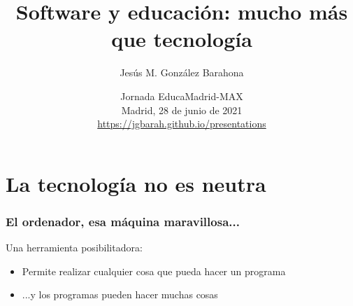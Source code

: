 \documentclass[17pt,aspectratio=169]{beamer}
\renewcommand{\secimage}{figs/bookpages}
\newcommand{\secimage}{figs/bookpages}
\begin{document}
\title{Software y educación: mucho más que tecnología}
\author{Jesús M. González Barahona}

\date{Jornada EducaMadrid-MAX \\
  Madrid, 28 de junio de 2021 \\
{\small \url{https://jgbarah.github.io/presentations}} \\}

\frame{
\maketitle
}





\renewcommand{\secimage}{figs/ordenador-bebe}


\section{La tecnología no es neutra}



\begin{frame}
\frametitle{El ordenador, esa máquina maravillosa...}

Una herramienta posibilitadora:

\begin{itemize}
\item Permite realizar cualquier cosa que pueda hacer un programa
\item ...y los programas pueden hacer muchas cosas
\end{itemize}


\end{frame}
\end{document}
